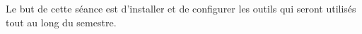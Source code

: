 



\ShowSolutiontrue
\ShowConseiltrue
\titre
{}

Le but de cette séance est d'installer et de configurer les outils qui seront utilisés tout au long du semestre. 

\begin{Exercice}


\end{Exercice}
